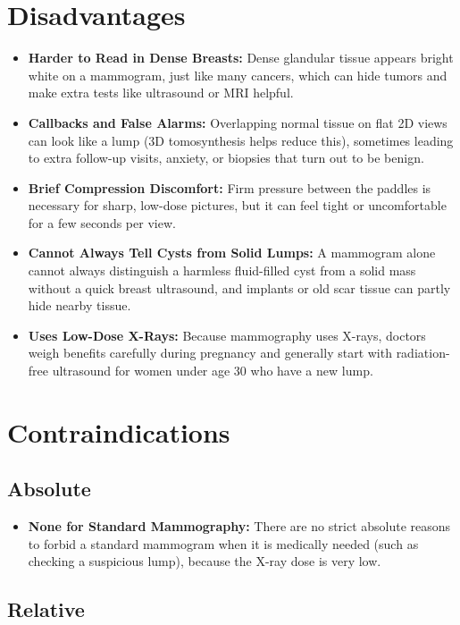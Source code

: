 \section{Disadvantages}

\begin{itemize}
    \item \textbf{Harder to Read in Dense Breasts:} Dense glandular tissue appears bright white on a mammogram, just like many cancers, which can hide tumors and make extra tests like ultrasound or MRI helpful.
    \item \textbf{Callbacks and False Alarms:} Overlapping normal tissue on flat 2D views can look like a lump (3D tomosynthesis helps reduce this), sometimes leading to extra follow-up visits, anxiety, or biopsies that turn out to be benign.
    \item \textbf{Brief Compression Discomfort:} Firm pressure between the paddles is necessary for sharp, low-dose pictures, but it can feel tight or uncomfortable for a few seconds per view.
    \item \textbf{Cannot Always Tell Cysts from Solid Lumps:} A mammogram alone cannot always distinguish a harmless fluid-filled cyst from a solid mass without a quick breast ultrasound, and implants or old scar tissue can partly hide nearby tissue.
    \item \textbf{Uses Low-Dose X-Rays:} Because mammography uses X-rays, doctors weigh benefits carefully during pregnancy and generally start with radiation-free ultrasound for women under age 30 who have a new lump.
\end{itemize}

\section{Contraindications}

\subsection{Absolute}

\begin{itemize}
    \item \textbf{None for Standard Mammography:} There are no strict absolute reasons to forbid a standard mammogram when it is medically needed (such as checking a suspicious lump), because the X-ray dose is very low.
\end{itemize}

\subsection{Relative}

